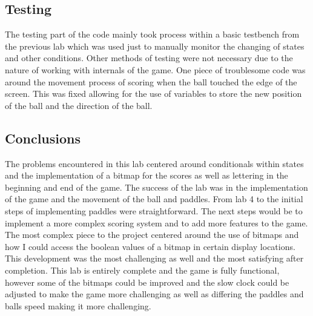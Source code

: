 \documentclass{article}
\begin{document}
\subsection*{Testing}
The testing part of the code mainly took process within a basic testbench from the previous lab which was used just to manually monitor the changing of states and other conditions.
Other methods of testing were not necessary due to the nature of working with internals of the game. One piece of troublesome code was around the movement process of scoring when the ball touched the edge of the screen. This was fixed allowing for the use of variables to store the new position of the ball and the direction of the ball.

\subsection*{Conclusions}
The problems encountered in this lab centered around conditionals within states and the implementation of a bitmap for the scores as well as lettering in the beginning and end of the game. The success of the lab was in the implementation of the game and the movement of the ball and paddles. From lab 4 to the initial steps of implementing paddles were straightforward. The next steps would be to implement a more complex scoring system and to add more features to the game. The most complex piece to the project centered around the use of bitmaps and how I could access the boolean values of a bitmap in certain display locations. This development was the most challenging as well and the most satisfying after completion.
This lab is entirely complete and the game is fully functional, however some of the bitmaps could be improved and the slow clock could be adjusted to make the game more challenging as well as differing the paddles and balls speed making it more challenging.
\end{document}
